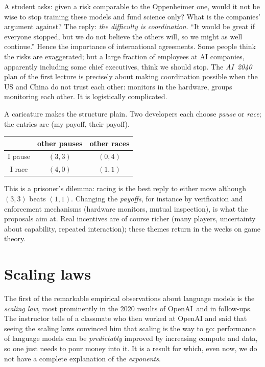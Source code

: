 \begin{discussion}
A student asks: given a risk comparable to the Oppenheimer one, would it not be wise to stop training these models and fund science only? What is the companies' argument against? The reply: \emph{the difficulty is coordination}. ``It would be great if everyone stopped, but we do not believe the others will, so we might as well continue.''
Hence the importance of international agreements. Some people think the risks are exaggerated; but a large fraction of employees at AI companies, apparently including some chief executives, think we should stop. The \emph{AI~2040} plan of the first lecture is precisely about making coordination possible when the US and China do not trust each other:
monitors in the hardware, groups monitoring each other. It is logistically complicated.
\end{discussion}

\begin{beyond}
A caricature makes the structure plain. Two developers each choose \emph{pause} or \emph{race}; the entries are (my payoff, their payoff).
\begin{center}\small
\begin{tabular}{@{}c|cc@{}}
  & other pauses & other races\\\hline
  I pause & $(3,3)$ & $(0,4)$\\
  I race  & $(4,0)$ & $(1,1)$
\end{tabular}
\end{center}
This is a prisoner's dilemma: racing is the best reply to either move although $(3,3)$ beats $(1,1)$. Changing the \emph{payoffs}, for instance by verification and enforcement mechanisms (hardware monitors, mutual inspection), is what the proposals aim at. Real incentives are of course richer (many players, uncertainty about capability, repeated interaction); these themes return in the weeks on game theory.
\end{beyond}

\section{Scaling laws}\label{sec:L2-scaling}
The first of the remarkable empirical observations about language models is the \emph{scaling law}, most prominently in the 2020 results of OpenAI\,\citep{kaplan2020} and in follow-ups. The instructor tells of a classmate who then worked at OpenAI and said that seeing the scaling laws convinced him that
scaling is the way to go: performance of language models can be \emph{predictably} improved by increasing compute and data, so one just needs to pour money into it. It is a result for which, even now, we do not have a complete explanation of the \emph{exponents}.

